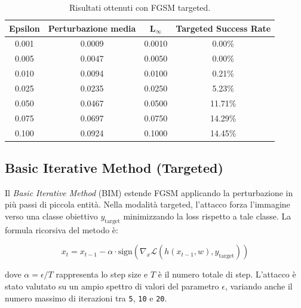             \begin{table}[H]
                \centering
                \label{tab:fgsm_targeted}
                \begin{tabular}{c|c|c|c}
                    \toprule
                    \textbf{Epsilon} & \textbf{Perturbazione media} & \(\mathbf{L_\infty}\) & \textbf{Targeted Success Rate} \\
                    \midrule
                    0.001 & 0.0009 & 0.0010 & 0.00\% \\
                    0.005 & 0.0047 & 0.0050 & 0.00\% \\
                    0.010 & 0.0094 & 0.0100 & 0.21\% \\
                    0.025 & 0.0235 & 0.0250 & 5.23\% \\
                    0.050 & 0.0467 & 0.0500 & 11.71\% \\
                    0.075 & 0.0697 & 0.0750 & 14.29\% \\
                    0.100 & 0.0924 & 0.1000 & 14.45\% \\
                    \bottomrule
                \end{tabular}
                \caption{Risultati ottenuti con FGSM targeted.}
            \end{table}

        \subsection{Basic Iterative Method (Targeted)}
            Il \textit{Basic Iterative Method} (BIM) estende FGSM applicando la perturbazione in più passi di piccola entità. Nella modalità targeted, l’attacco forza l'immagine verso una classe obiettivo $y_{\text{target}}$ minimizzando la loss rispetto a tale classe. La formula ricorsiva del metodo è:
            
            \[
            x_t = x_{t-1} - \alpha \cdot \text{sign}\left( \nabla_x \mathcal{L}(h(x_{t-1}, w), y_{\text{target}}) \right)
            \]
            
            \noindent dove $\alpha = \epsilon / T$ rappresenta lo step size e $T$ è il numero totale di step.
            L'attacco  è stato valutato su un ampio spettro di valori del parametro \(\epsilon\), variando anche il numero massimo di iterazioni tra \texttt{5}, \texttt{10} e \texttt{20}. 
            

